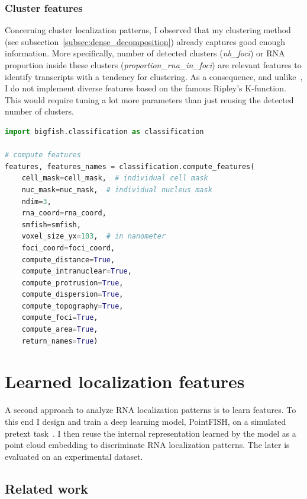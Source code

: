 \subsubsection{Cluster features}

Concerning cluster localization patterns, I observed that my clustering method (see subsection~\ref{subsec:dense_decomposition}) already captures good enough information.
More specifically, number of detected clusters (\emph{nb\_foci}) or \ac{RNA} proportion inside these clusters (\emph{proportion\_rna\_in\_foci}) are relevant features to identify transcripts with a tendency for clustering.
As a consequence, and unlike~\cite{samacoits_computational_2018}, I do not implement diverse features based on the famous Ripley's K-function.
This would require tuning a lot more parameters than just reusing the detected number of clusters.\\

\begin{minipage}{0.9\textwidth}
\begin{lstlisting}[language=Python]
import bigfish.classification as classification

# compute features
features, features_names = classification.compute_features(
    cell_mask=cell_mask,  # individual cell mask
	nuc_mask=nuc_mask,  # individual nucleus mask
	ndim=3,
	rna_coord=rna_coord,
    smfish=smfish,
	voxel_size_yx=103,  # in nanometer
    foci_coord=foci_coord,
    compute_distance=True,
    compute_intranuclear=True,
    compute_protrusion=True,
    compute_dispersion=True,
    compute_topography=True,
    compute_foci=True,
    compute_area=True,
    return_names=True)
\end{lstlisting}
\end{minipage}

\section{Learned localization features}
\label{sec:learned_features}

A second approach to analyze \ac{RNA} localization patterns is to learn features.
To this end I design and train a deep learning model, PointFISH, on a simulated pretext task~\cite{pointfish_2022}.
I then reuse the internal representation learned by the model as a point cloud embedding to discriminate \ac{RNA} localization patterns.
The later is evaluated on an experimental dataset.

\subsection{Related work}
\label{subsec:related_work_learned_features}

